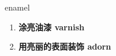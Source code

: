 
\begin{frame}
{\huge enamel}
\begin{center}
\begin{enumerate}\Large
  \item \textbf{涂亮油漆 varnish}
  \item \textbf{用亮丽的表面装饰 adorn}
\end{enumerate}
\end{center}
\end{frame}
